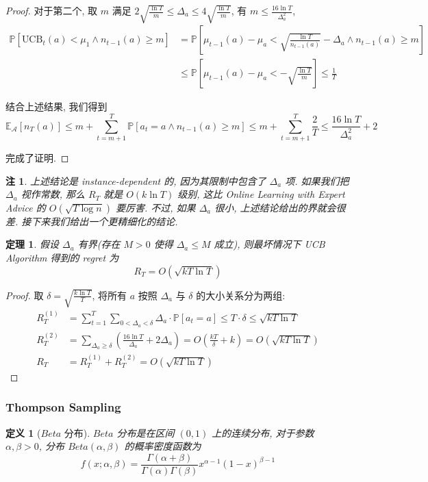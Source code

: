 \documentclass[8pt]{article}
\theoremstyle{compact}
\newtheorem{theorem}{定理}[section]
\newtheorem{definition}{定义}[section]
\newtheorem{remark}{注}[section]
\def\le{\leqslant}
\def\ge{\geqslant}
\def\P#1{\mathbb{P}\left[{#1}\right]}
\begin{document}
\begin{proof}
	对于第二个, 取 $m$ 满足 $2\sqrt{\frac{\ln T}{m}}\le \Delta_a \le 4\sqrt{\frac{\ln T}{m}}$, 有 $m \le \frac{16 \ln T}{\Delta_a^2}$, \begin{equation*}
		\begin{split}
			\P{\text{UCB}_t(a) < \mu_1 \wedge n_{t-1}(a) \ge m} &= \P{\mu_{t-1}(a) - \mu_a < \sqrt{\frac{\ln T}{n_{t-1}(a)}} - \Delta_a \wedge n_{t-1}(a) \ge m}\\
			&\le \P{\mu_{t-1}(a) - \mu_a < -\sqrt{\frac{\ln T}{m}}} \le \frac1T
		\end{split}
	\end{equation*}

	结合上述结果, 我们得到
	$$\mathbb E_{\mathcal A}[n_T(a)] \le m + \sum_{t=m+1}^T \P{a_t = a \wedge n_{t-1}(a) \ge m} \le m + \sum_{t=m+1}^T \frac2T \le \frac{16\ln T}{\Delta_a^2} + 2$$

	完成了证明.
\end{proof}
\begin{remark}
	上述结论是 instance-dependent 的, 因为其限制中包含了 $\Delta_a$ 项. 如果我们把 $\Delta_a$ 视作常数, 那么 $R_T$ 就是 $O(k\ln T)$ 级别, 这比 Online Learning with Expert Advice 的 $O(\sqrt{T\log n})$ 要厉害. 不过, 如果 $\Delta_a$ 很小, 上述结论给出的界就会很差. 接下来我们给出一个更精细化的结论.
\end{remark}
\begin{theorem}
	假设 $\Delta_a$ 有界(存在 $M > 0$ 使得 $\Delta_a \le M$ 成立), 则最坏情况下 UCB Algorithm 得到的 regret 为 $$R_T = O(\sqrt{kT\ln T})$$
\end{theorem}
\begin{proof}
	取 $\delta = \sqrt{\frac{k\ln T}{T}}$, 将所有 $a$ 按照 $\Delta_a$ 与 $\delta$ 的大小关系分为两组: \begin{equation*}
		\begin{split}
			R_T^{(1)} &= \sum_{t=1}^{T} \sum_{0 < \Delta_a < \delta} \Delta_a \cdot \P{a_t = a} \le T \cdot \delta \le \sqrt{kT\ln T}\\
			R_T^{(2)} &= \sum_{\Delta_a \ge \delta}\left(\frac{16\ln T}{\Delta_a} + 2\Delta_a\right) = O\left(\frac{kT}{\delta} + k\right) = O(\sqrt{kT\ln T})\\
			R_T &= R_T^{(1)} + R_T^{(2)} = O(\sqrt{kT\ln T})
		\end{split}
	\end{equation*}
\end{proof}

\subsubsection{Thompson Sampling}
\begin{definition}[$Beta$ 分布]
	$Beta$ 分布是在区间 $(0, 1)$ 上的连续分布, 对于参数 $\alpha, \beta > 0$, 分布 $Beta(\alpha, \beta)$ 的概率密度函数为 $$f(x; \alpha, \beta) = \frac{\Gamma(\alpha + \beta)}{\Gamma(\alpha)\Gamma(\beta)}x^{\alpha-1}(1-x)^{\beta-1}$$
\end{definition}
\end{document}
